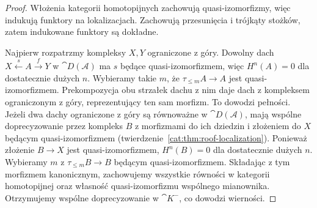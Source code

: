 \begin{proof}
Włożenia kategorii homotopijnych zachowują quasi-izomorfizmy, więc indukują funktory na lokalizacjach. Zachowują przesunięcia i trójkąty stożków, zatem indukowane funktory są dokładne.

Najpierw rozpatrzmy kompleksy $X,Y$ ograniczone z góry. Dowolny dach $X\xleftarrow{s}A\xrightarrow f Y$ w $\cat D(\mathcal A)$ ma $s$ będące quasi-izomorfizmem, więc $H^n(A)=0$ dla dostatecznie dużych $n$. Wybieramy takie $m$, że $\tau_{\le m}A\to A$ jest quasi-izomorfizmem. Prekompozycja obu strzałek dachu z nim daje dach z kompleksem ograniczonym z góry, reprezentujący ten sam morfizm. To dowodzi pełności. Jeżeli dwa dachy ograniczone z góry są równoważne w $\cat D(\mathcal A)$, mają wspólne doprecyzowanie przez kompleks $B$ z morfizmami do ich dziedzin i złożeniem do $X$ będącym quasi-izomorfizmem (twierdzenie~\ref{cat:thm:roof-localization}). Ponieważ złożenie $B\to X$ jest quasi-izomorfizmem, $H^n(B)=0$ dla dostatecznie dużych $n$. Wybieramy $m$ z $\tau_{\le m}B\to B$ będącym quasi-izomorfizmem. Składając z tym morfizmem kanonicznym, zachowujemy wszystkie równości w kategorii homotopijnej oraz własność quasi-izomorfizmu wspólnego mianownika. Otrzymujemy wspólne doprecyzowanie w $\cat K^-$, co dowodzi wierności.


\end{proof}
